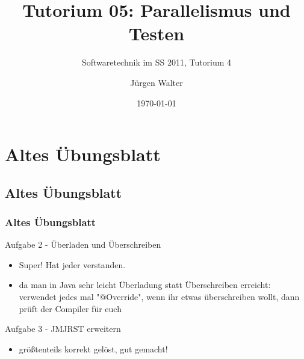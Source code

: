 

\title[Tutorium05]{Tutorium 05: Parallelismus und Testen}
\subtitle{Softwaretechnik im SS 2011, Tutorium 4}
\author{Jürgen Walter}
\date{\today}




\begin{frame}
\titlepage
\end{frame}


\section{Altes Übungsblatt}

\subsection{Altes Übungsblatt}


\begin{frame}[fragile]
\frametitle{Altes Übungsblatt}
	\begin{block}{Aufgabe 2 - Überladen und Überschreiben}
	\begin{itemize}
	\item Super! Hat jeder verstanden.
	\item da man in Java sehr leicht Überladung statt Überschreiben erreicht: \\
		verwendet jedes mal "@Override", wenn ihr etwas überschreiben wollt, dann prüft der Compiler für euch
	\end{itemize}
	\end{block}
	\pause
	\begin{block}{Aufgabe 3 - JMJRST erweitern} 
	\begin{itemize}
	\item größtenteils korrekt gelöst, gut gemacht!
	\end{itemize}
	\end{block}
\end{frame}

